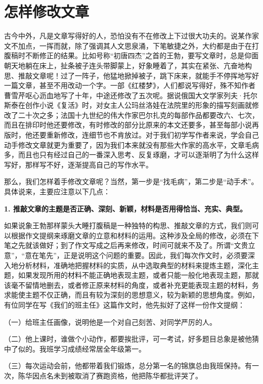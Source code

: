 \section{怎样修改文章}

古今中外，凡是文章写得好的人，恐怕没有不在修改上下过很大功夫的。说某作家文不加点，一挥而就，除了强调其人文思泉涌，下笔敏捷之外，大约都是由于在打腹稿时不断修正的结果。比如号称“初唐四杰”之首的王勃，要写文章时，总是仰面朝天地躺在床上，扯条被子连头带脚蒙上，好象睡着了，其实在紧张、亢奋地构思、推敲文章呢！过了一阵子，他猛地掀掉被子，跳下床来，就能手不停挥地写好一篇文章，甚至不用改动一个字。一部《红楼梦》，人们都说写得好，殊不知作者曹雪芹呕心沥血地写了十年，中途还修改了五次呢。据说俄国大文学家列夫·托尔斯泰在创作小说《复活》时，对女主人公玛丝洛娃在法院里的形象的描写刻画就修改了二十次之多；法国十九世纪的伟大作家巴尔扎克的每部作品都要改六、七次，而且在排印时他还要修改，有时修改的部分比原来的本文还要多，甚至每部小说再版时，他还要重新修改，连细节也不肯放过。对于我们初学写作者来说，学会自己动手修改文章就更为重要了，因为我们本来就没有那些大作家的高水平，文章毛病多，而且也只有经过自己的一番深入思考、反复琢磨，才可以逐渐明了为什么这样写好，那样写不好，逐渐提高自己的写作水平。

那么，我们怎样着手修改文章呢？当然，第一步是“找毛病”，第二步是“动手术”。具体说来，主要应注意以下几点：

\textbf{1. 推敲文章的主题是否正确、深刻、新颖，材料是否用得恰当、充实、典型。}

如果说象王勃那样蒙头大睡打腹稿是一种独特的构思、推敲文章的方式，我们则可以根据作文提纲来琢磨文章的立意和材料的运用。这种涉及全局的修改，必须在下笔之先就该做好；到了作文写成之后再来修改，时间可就来不及了。所谓“文贵立意”，“意在笔先”，正是说明这个问题的重要。因此，我们每次作文时，必须要深入地分析材料，准确地把握材料的实质，从中选取典型的材料来提炼主题，深化主题，如果发现所用的材料不能正确地表现主题，或者只能一般化地表现主题，那就该毫不留情地删去，或者修正原来材料的角度，或者补充更能表现主题的材料，务求能使主题不仅正确，而且有较为深刻的思想意义，较为新颖的思想角度。例如，有位同学在写《我们的班主任》这篇作文时，他先拟好了这样一份作文提纲：

（一）给班主任画像，说明他是一个对自己刻苦、对同学严厉的人。

（二）他上课时，谁做个小动作，都要挨批评，可一考试，好多题目总象是被他猜中了似的。我班学习成绩经常居全年级第一。

（三）每次运动会前，他都带着我们锻炼，总分第一名的锦旗总由我班保持。有一次，陈华因点名未到被取消了赛跑资格，他把陈华都批评哭了。

